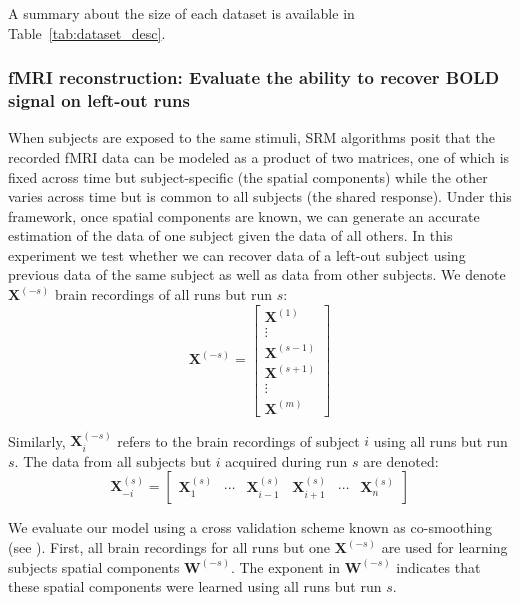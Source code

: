 A summary about the size of each dataset is available in Table~\ref{tab:dataset_desc}.


\subsubsection{fMRI reconstruction: Evaluate the ability to recover BOLD signal on left-out runs}
\label{reconstruction}

When subjects are exposed to the same stimuli, SRM algorithms posit that the recorded fMRI data can be modeled as a product of two matrices, one of which is fixed across time but subject-specific (the spatial components) while the other varies across time but is common to all subjects (the shared response).
%
Under this framework, once spatial components are known, we can generate an accurate estimation of the data of one subject given the data of all others.
%
In this experiment we test whether we can recover data of a left-out subject using previous data of the same subject as well as data from other subjects. 
We denote $\mathbf{X}^{(-s)}$ brain recordings of all runs but run $s$:
 \begin{equation*}
	 \mathbf{X}^{(-s)} = 
\begin{bmatrix}
	\mathbf{X}^{(1)} \\
	\vdots \\
	\mathbf{X}^{(s-1)} \\
	\mathbf{X}^{(s+1)} \\
	\vdots \\
	\mathbf{X}^{(m)}
\end{bmatrix}
\end{equation*}

Similarly, $\mathbf{X}_i^{(-s)}$ refers to the brain recordings of subject $i$ using all runs but run $s$. The data from all subjects but $i$ acquired during run $s$ are denoted:
\begin{equation*}
	\mathbf{X}^{(s)}_{-i} = 
\begin{bmatrix}
	\mathbf{X}_1^{(s)} & \cdots & \mathbf{X}^{(s)}_{i-1} & \mathbf{X}^{(s)}_{i+1} & \cdots & \mathbf{X}^{(s)}_{n} 
\end{bmatrix}
\end{equation*}

We evaluate our model using a cross validation scheme known as co-smoothing (see \cite{wu2018learning}). First, all brain recordings for all runs but one $\mathbf{X}^{(-s)}$ are used for learning subjects spatial components $\mathbf{W}^{(-s)}$. The exponent in $\mathbf{W}^{(-s)}$ indicates that these spatial components were learned using all runs but run $s$. 


